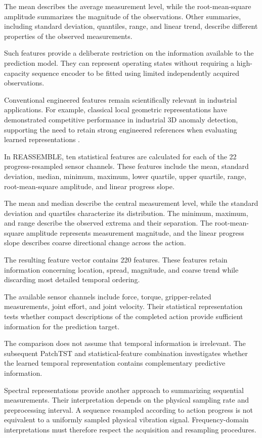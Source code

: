 The mean describes the average measurement level, while the root-mean-square amplitude summarizes the magnitude of the observations. Other summaries, including standard deviation, quantiles, range, and linear trend, describe different properties of the observed measurements.

Such features provide a deliberate restriction on the information available to the prediction model. They can represent operating states without requiring a high-capacity sequence encoder to be fitted using limited independently acquired observations.

Conventional engineered features remain scientifically relevant in industrial applications. For example, classical local geometric representations have demonstrated competitive performance in industrial 3D anomaly detection, supporting the need to retain strong engineered references when evaluating learned representations \parencite{Horwitz2023Back}.

In REASSEMBLE, ten statistical features are calculated for each of the 22 progress-resampled sensor channels. These features include the mean, standard deviation, median, minimum, maximum, lower quartile, upper quartile, range, root-mean-square amplitude, and linear progress slope.

The mean and median describe the central measurement level, while the standard deviation and quartiles characterize its distribution. The minimum, maximum, and range describe the observed extrema and their separation. The root-mean-square amplitude represents measurement magnitude, and the linear progress slope describes coarse directional change across the action.

The resulting feature vector contains 220 features. These features retain information concerning location, spread, magnitude, and coarse trend while discarding most detailed temporal ordering.

The available sensor channels include force, torque, gripper-related measurements, joint effort, and joint velocity. Their statistical representation tests whether compact descriptions of the completed action provide sufficient information for the prediction target.

The comparison does not assume that temporal information is irrelevant. The subsequent PatchTST and statistical-feature combination investigates whether the learned temporal representation contains complementary predictive information.

Spectral representations provide another approach to summarizing sequential measurements. Their interpretation depends on the physical sampling rate and preprocessing interval. A sequence resampled according to action progress is not equivalent to a uniformly sampled physical vibration signal. Frequency-domain interpretations must therefore respect the acquisition and resampling procedures.

